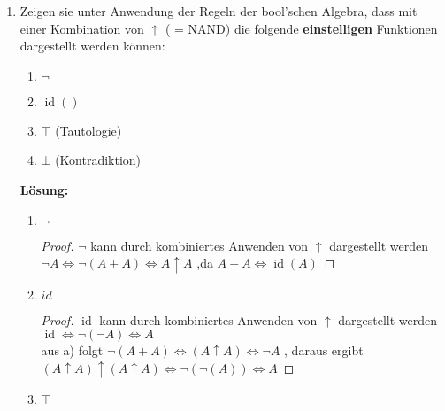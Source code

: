 \documentclass[paper=a4,fontsize=11pt]{scrartcl}%
\numberwithin{equation}{section}
\newenvironment{solution}
	{
		\color{Blue}
		\textbf{Lösung:}
	}{}
\DeclareMathOperator{\id}{id}
\begin{document}
\begin{enumerate}
\begin{enumerate}
		\begin{solution}
		\begin{align*}
		&~ \overline{x \land y} \lor \overline{x \land \overline{z}}\\
		&= \overline{x} \lor \overline{y} \lor \overline{x} \lor z\\
		&= \overline{x} \lor \overline{y} \lor z\\
		&= \overline{x} \lor (\overline{y} \lor z)\\
		&= \overline{x} \lor (y \Rightarrow z)\\
		&= x \Rightarrow (y \Rightarrow z)
		\end{align*}
		\end{solution}
	\end{enumerate}
	Stellen sie $\varphi_1$ unter ausschließlicher Verwendung der NOR-Funktion, $\varphi_2$ unter ausschließlicher Verwendung der NAND-Funktion und $\varphi_3$ unter ausschließlicher Verwendung der Implikation dar.
	\item Zeigen sie unter Anwendung der Regeln der bool'schen Algebra, dass mit einer Kombination von $\uparrow$ ( = NAND) die folgende \textbf{einstelligen} Funktionen dargestellt werden können:
	\begin{enumerate}
		\item $\neg $
		\item $ \id()$
		\item $\top$ (Tautologie)
		\item $\bot$ (Kontradiktion)
	\end{enumerate}
	
	\begin{solution}
	\begin{enumerate}
	\item $\neg$
	\begin{proof}
$\neg$ kann durch kombiniertes Anwenden von $\uparrow$ dargestellt werden\\
$\neg A \Leftrightarrow \neg (A +A) \Leftrightarrow A \uparrow A $ ,da $A + A \Leftrightarrow \id(A)$
\end{proof}
\item $id$

\begin{proof}
$\id$ kann durch kombiniertes Anwenden von $\uparrow$ dargestellt werden\\
$\id \Leftrightarrow \neg(\neg A) \Leftrightarrow A$ \\
aus a) folgt $\neg(A + A) \Leftrightarrow (A \uparrow A) \Leftrightarrow \neg A$ , daraus ergibt
$(A \uparrow A) \uparrow (A \uparrow A) \Leftrightarrow \neg(\neg(A)) \Leftrightarrow A$
\end{proof}
\item $\top$


\end{enumerate}
\end{solution}
\end{enumerate}
\end{document}
